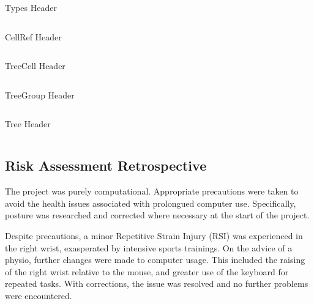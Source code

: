 \documentclass[twoside]{IIBproject}
\numberwithin{figure}{section}
\begin{document}

        \begin{listing}[H]
            \caption{Types Header}
            \label{src:types}
            \inputminted[mathescape,fontsize=\scriptsize]{cpp}{headers/types.h}
        \end{listing}

        \begin{listing}[H]
            \caption{CellRef Header}
            \label{src:cellref}
            \inputminted[mathescape,fontsize=\scriptsize]{cpp}{headers/cellref.h}
        \end{listing}

        \begin{listing}[H]
            \caption{TreeCell Header}
            \label{src:treecell}
            \inputminted[mathescape,fontsize=\scriptsize]{cpp}{headers/treecell.h}
        \end{listing}

        \begin{listing}[H]
            \caption{TreeGroup Header}
            \label{src:treegroup}
            \inputminted[mathescape,fontsize=\scriptsize]{cpp}{headers/treegroup.h}
        \end{listing}

        \begin{listing}[H]
            \caption{Tree Header}
            \label{src:tree}
            \inputminted[mathescape,fontsize=\scriptsize]{cpp}{headers/tree.h}
        \end{listing}






    \subsection{Risk Assessment Retrospective} %
        \label{sec:appendix-ra}

        The project was purely computational. Appropriate precautions were taken to avoid the health issues associated with prolongued computer use. Specifically, posture was researched and corrected where necessary at the start of the project.

        Despite precautions, a minor Repetitive Strain Injury (RSI) was experienced in the right wrist, exasperated by intensive sports trainings. On the advice of a physio, further changes were made to computer usage. This included the raising of the right wrist relative to the mouse, and greater use of the keyboard for repeated tasks. With corrections, the issue was resolved and no further problems were encountered. 


\end{document}
